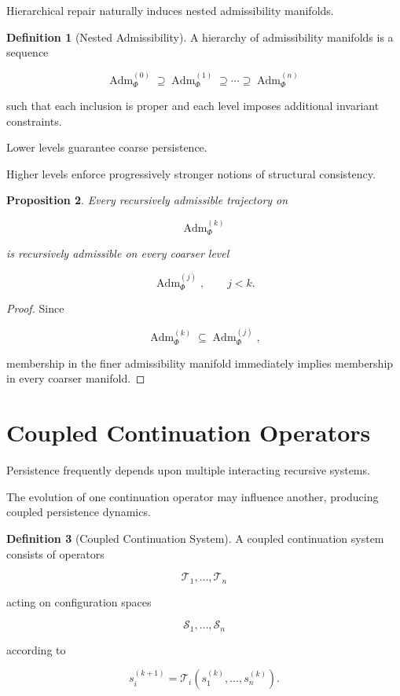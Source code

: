 \documentclass[11pt]{book}
\numberwithin{equation}{chapter}
\theoremstyle{definition}
\newtheorem{definition}{Definition}[chapter]
\theoremstyle{plain}
\newtheorem{proposition}[definition]{Proposition}
\begin{document}
Hierarchical repair naturally induces nested admissibility manifolds.

\begin{definition}[Nested Admissibility]

A hierarchy of admissibility manifolds is a sequence

\[
\operatorname{Adm}_{\Phi}^{(0)}
\supseteq
\operatorname{Adm}_{\Phi}^{(1)}
\supseteq
\cdots
\supseteq
\operatorname{Adm}_{\Phi}^{(n)}
\]

such that each inclusion is proper and each level imposes additional
invariant constraints.

\end{definition}

Lower levels guarantee coarse persistence.

Higher levels enforce progressively stronger notions of structural
consistency.

\begin{proposition}

Every recursively admissible trajectory on

\[
\operatorname{Adm}_{\Phi}^{(k)}
\]

is recursively admissible on every coarser level

\[
\operatorname{Adm}_{\Phi}^{(j)},
\qquad
j<k.
\]

\end{proposition}

\begin{proof}

Since

\[
\operatorname{Adm}_{\Phi}^{(k)}
\subseteq
\operatorname{Adm}_{\Phi}^{(j)},
\]

membership in the finer admissibility manifold immediately implies
membership in every coarser manifold.

\end{proof}

\section{Coupled Continuation Operators}

Persistence frequently depends upon multiple interacting recursive
systems.

The evolution of one continuation operator may influence another,
producing coupled persistence dynamics.

\begin{definition}[Coupled Continuation System]

A coupled continuation system consists of operators

\[
\mathcal T_1,\ldots,\mathcal T_n
\]

acting on configuration spaces

\[
\mathcal S_1,\ldots,\mathcal S_n
\]

according to

\[
s_i^{(k+1)}
=
\mathcal T_i
\!\left(
s_1^{(k)},
\ldots,
s_n^{(k)}
\right).
\]

\end{definition}
\end{document}
